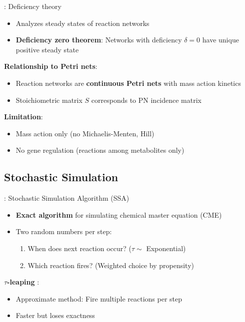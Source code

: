 \textbf{\citet{Feinberg1987}}: Deficiency theory

\begin{itemize}
    \item Analyzes steady states of reaction networks
    \item \textbf{Deficiency zero theorem}: Networks with deficiency $\delta=0$ have unique positive steady state
\end{itemize}

\textbf{Relationship to Petri nets}:

\begin{itemize}
    \item Reaction networks are \textbf{continuous Petri nets} with mass action kinetics
    \item Stoichiometric matrix $S$ corresponds to PN incidence matrix
\end{itemize}

\textbf{Limitation}:

\begin{itemize}
    \item Mass action only (no Michaelis-Menten, Hill)
    \item No gene regulation (reactions among metabolites only)
\end{itemize}

\subsection{Stochastic Simulation}
\label{subsec:stochastic-simulation}

\textbf{\citet{Gillespie1977}}: Stochastic Simulation Algorithm (SSA)

\begin{itemize}
    \item \textbf{Exact algorithm} for simulating chemical master equation (CME)
    \item Two random numbers per step:
    \begin{enumerate}
        \item When does next reaction occur? ($\tau \sim$ Exponential)
        \item Which reaction fires? (Weighted choice by propensity)
    \end{enumerate}
\end{itemize}

\textbf{$\tau$-leaping} \citep{Gillespie2001}:

\begin{itemize}
    \item Approximate method: Fire multiple reactions per step
    \item Faster but loses exactness
\end{itemize}


